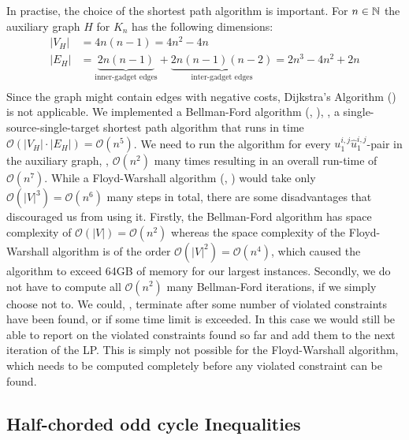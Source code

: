 In practise, the choice of the shortest path algorithm is important.
For $n \in \mathbb{N}$ the auxiliary graph $H$ for $K_{n}$ has the following dimensions:
\begin{align*}
	\lvert V_{H} \rvert &= 4 n(n-1) = 4n^{2} - 4n \\
	\lvert E_{H} \rvert &= \underbrace{2 n(n-1)}_{\text{inner-gadget edges}} + \underbrace{2 n(n-1)(n-2)}_{\text{inter-gadget edges}} = 2n^{3} - 4n^{2} + 2n \\
\end{align*}
Since the graph might contain edges with negative costs, Dijkstra’s Algorithm (\cite{dijkstraNoteTwoProblems1959}) is not applicable.
We implemented a Bellman-Ford algorithm (\cite{bellmanRoutingProblem1958}, \cite{fordNetworkFlowTheory1956}), \ie, a single-source-single-target shortest path algorithm that runs in time $\mathcal{O}(\lvert V_{H} \rvert \cdot \lvert E_{H} \rvert) = \mathcal{O}(n^{5})$.
We need to run the algorithm for every $u_{1}^{i,j}\hat{u}_{1}^{i,j}$-pair in the auxiliary graph, \ie, $\mathcal{O}(n^{2})$ many times resulting in an overall run-time of $\mathcal{O}(n^{7})$.
While a Floyd-Warshall algorithm (\cite{floydAlgorithm97Shortest1962}, \cite{warshallTheoremBooleanMatrices1962}) would take only $\mathcal{O}(\lvert V \rvert^3) = \mathcal{O}(n^{6})$ many steps in total, there are some disadvantages that discouraged us from using it.
Firstly, the Bellman-Ford algorithm has space complexity of $\mathcal{O}(\lvert V \rvert) = \mathcal{O}(n^{2})$ whereas the space complexity of the Floyd-Warshall algorithm is of the order $\mathcal{O}(\lvert V \rvert^{2}) = \mathcal{O}(n^{4})$, which caused the algorithm to exceed 64GB of memory for our largest instances.
Secondly, we do not have to compute all $\mathcal{O}(n^{2})$ many Bellman-Ford iterations, if we simply choose not to.
We could, \eg, terminate after some number of violated constraints have been found, or if some time limit is exceeded.
In this case we would still be able to report on the violated constraints found so far and add them to the next iteration of the LP.
This is simply not possible for the Floyd-Warshall algorithm, which needs to be computed completely before any violated constraint can be found.


\subsection{Half-chorded odd cycle Inequalities}\label{subsec:half_chorded_separator}

